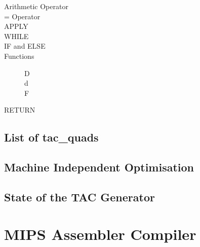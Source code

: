 \begin{description}
	\item[Arithmetic Operator]
	\item[= Operator]
	\item[APPLY]
	\item[WHILE]
	\item[IF and ELSE]
	\item[Functions]
		\begin{description}
			\item[D]
			\item[d]
			\item[F]
		\end{description}
	\item[RETURN]
\end{description}

\subsection{List of tac\_quads}
\subsection{Machine Independent Optimisation}
\subsection{State of the TAC Generator}

\section{MIPS Assembler Compiler}
\label{section:MIPS}
